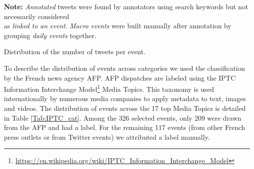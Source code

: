 \begin{table}
\begin{center}
\makebox[\textwidth][c]{}
{\scriptsize \textbf{Note:} \textit{Annotated} tweets were found by annotators using search
keywords but not necessarily considered \\as \textit{linked to an event}. \textit{Macro events} were built manually after annotation by grouping \textit{daily events} together.}
\end{center}
\caption{Distribution of the number of tweets per event. \label{Tab:event_distrib}}
\end{table}



%
%

%
%

To describe the distribution of events across categories we used the classification by the French news agency AFP. AFP dispatches are labeled using the IPTC Information Interchange Model\footnote{\url{https://en.wikipedia.org/wiki/IPTC_Information_Interchange_Model}} Media Topics. This taxonomy is used internationally by numerous media companies to apply metadata to text, images and videos. The distribution of events across the 17 top Media Topics is detailed in Table \ref{Tab:IPTC_cat}. Among the 326 selected events, only 209 were drawn from the AFP and had a label. For the remaining 117 events (from other French press outlets or from Twitter events) we attributed a label manually.

